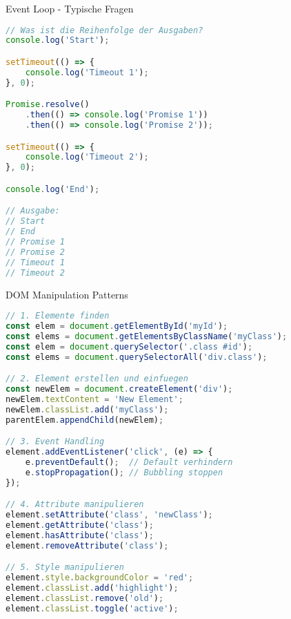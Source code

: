 \begin{examplecode}{Event Loop - Typische Fragen}
\begin{lstlisting}[language=JavaScript, style=basesmol]
// Was ist die Reihenfolge der Ausgaben?
console.log('Start');

setTimeout(() => {
    console.log('Timeout 1');
}, 0);

Promise.resolve()
    .then(() => console.log('Promise 1'))
    .then(() => console.log('Promise 2'));

setTimeout(() => {
    console.log('Timeout 2');
}, 0);

console.log('End');

// Ausgabe:
// Start
// End
// Promise 1
// Promise 2
// Timeout 1
// Timeout 2
\end{lstlisting}
\end{examplecode}

\begin{KR}{DOM Manipulation Patterns}
\begin{lstlisting}[language=JavaScript, style=basesmol]
// 1. Elemente finden
const elem = document.getElementById('myId');
const elems = document.getElementsByClassName('myClass');
const elem = document.querySelector('.class #id');
const elems = document.querySelectorAll('div.class');

// 2. Element erstellen und einfuegen
const newElem = document.createElement('div');
newElem.textContent = 'New Element';
newElem.classList.add('myClass');
parentElem.appendChild(newElem);

// 3. Event Handling
element.addEventListener('click', (e) => {
    e.preventDefault();  // Default verhindern
    e.stopPropagation(); // Bubbling stoppen
});

// 4. Attribute manipulieren
element.setAttribute('class', 'newClass');
element.getAttribute('class');
element.hasAttribute('class');
element.removeAttribute('class');

// 5. Style manipulieren
element.style.backgroundColor = 'red';
element.classList.add('highlight');
element.classList.remove('old');
element.classList.toggle('active');
\end{lstlisting}
\end{KR}

